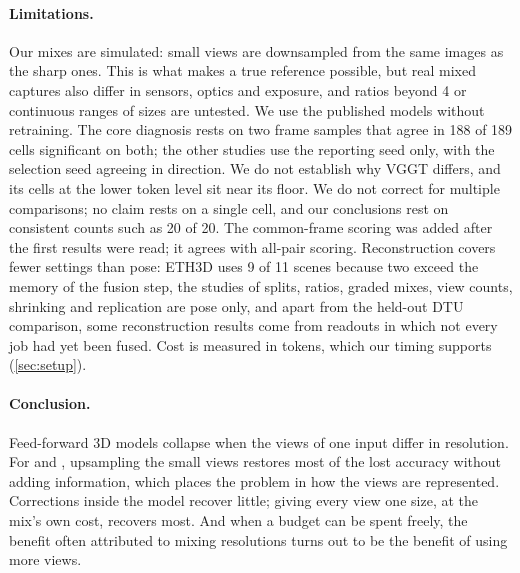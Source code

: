 \paragraph{Limitations.}
Our mixes are simulated: small views are downsampled from the same images as the sharp ones. This is what makes a true reference possible, but real mixed captures also differ in sensors, optics and exposure, and ratios beyond 4 or continuous ranges of sizes are untested. We use the published models without retraining. The core diagnosis rests on two frame samples that agree in 188 of 189 cells significant on both; the other studies use the reporting seed only, with the selection seed agreeing in direction. We do not establish why VGGT differs, and its cells at the lower token level sit near its floor. We do not correct for multiple comparisons; no claim rests on a single cell, and our conclusions rest on consistent counts such as 20 of 20. The common-frame scoring was added after the first results were read; it agrees with all-pair scoring. Reconstruction covers fewer settings than pose: ETH3D uses 9 of 11 scenes because two exceed the memory of the fusion step, the studies of splits, ratios, graded mixes, view counts, shrinking and replication are pose only, and apart from the held-out DTU comparison, some reconstruction results come from readouts in which not every job had yet been fused. Cost is measured in tokens, which our timing supports (\cref{sec:setup}).

\paragraph{Conclusion.}
Feed-forward 3D models collapse when the views of one input differ in resolution. For \pithree and \dathree, upsampling the small views restores most of the lost accuracy without adding information, which places the problem in how the views are represented. Corrections inside the model recover little; giving every view one size, at the mix's own cost, recovers most. And when a budget can be spent freely, the benefit often attributed to mixing resolutions turns out to be the benefit of using more views.
